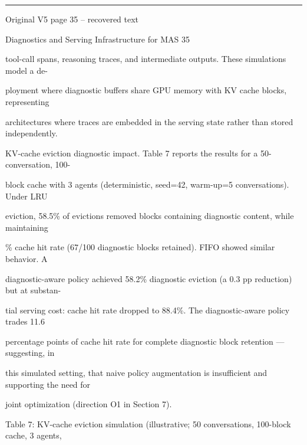 \par\smallskip\noindent\rule{\textwidth}{0.4pt}\par{\sffamily\footnotesize Original V5 page 35 -- recovered text}\par\begin{flushleft}\footnotesize\ttfamily
\par\smallskip
\par\smallskip
\noindent Diagnostics and Serving Infrastructure for MAS 35\par
\par\smallskip
\par\smallskip
\par\smallskip
\noindent tool-call spans, reasoning traces, and intermediate outputs. These simulations model a de-\par
\noindent ployment where diagnostic buffers share GPU memory with KV cache blocks, representing\par
\noindent architectures where traces are embedded in the serving state rather than stored independently.\par
\par\smallskip
\noindent KV-cache eviction diagnostic impact. Table 7 reports the results for a 50-conversation, 100-\par
\noindent block cache with 3 agents (deterministic, seed=42, warm-up=5 conversations). Under LRU\par
\noindent eviction, 58.5\% of evictions removed blocks containing diagnostic content, while maintaining\par
{}\% cache hit rate (67/100 diagnostic blocks retained). FIFO showed similar behavior. A\par
\noindent diagnostic-aware policy achieved 58.2\% diagnostic eviction (a 0.3 pp reduction) but at substan-\par
\noindent tial serving cost: cache hit rate dropped to 88.4\%. The diagnostic-aware policy trades 11.6\par
\noindent percentage points of cache hit rate for complete diagnostic block retention — suggesting, in\par
\noindent this simulated setting, that naive policy augmentation is insufficient and supporting the need for\par
\noindent joint optimization (direction O1 in Section 7).\par
\par\smallskip
\noindent Table 7: KV-cache eviction simulation (illustrative; 50 conversations, 100-block cache, 3 agents,\par

\end{flushleft}
